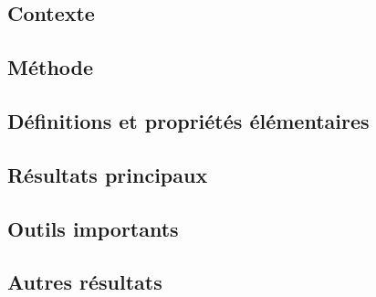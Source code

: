 \documentclass[11pt,a4paper]{article}
\begin{document}
\subsection*{Contexte}

\subsection*{Méthode}

\subsection*{Définitions et propriétés élémentaires}

\subsection*{Résultats principaux}

\subsection*{Outils importants}


\subsection*{Autres résultats}
\end{document}
